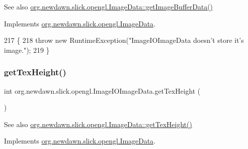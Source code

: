\begin{DoxySeeAlso}{See also}
\mbox{\hyperlink{interfaceorg_1_1newdawn_1_1slick_1_1opengl_1_1_image_data_a7b15d49f552cad075bb1179668ce5250}{org.\+newdawn.\+slick.\+opengl.\+Image\+Data\+::get\+Image\+Buffer\+Data()}} 
\end{DoxySeeAlso}


Implements \mbox{\hyperlink{interfaceorg_1_1newdawn_1_1slick_1_1opengl_1_1_image_data_a7b15d49f552cad075bb1179668ce5250}{org.\+newdawn.\+slick.\+opengl.\+Image\+Data}}.


\begin{DoxyCode}
217                                            \{
218         \textcolor{keywordflow}{throw} \textcolor{keyword}{new} RuntimeException(\textcolor{stringliteral}{"ImageIOImageData doesn't store it's image."});
219     \} 
\end{DoxyCode}
\mbox{\label{classorg_1_1newdawn_1_1slick_1_1opengl_1_1_image_i_o_image_data_a771cf308dff01137431513eb48497cd2}} 
\subsubsection{\texorpdfstring{get\+Tex\+Height()}{getTexHeight()}}
{\footnotesize\ttfamily int org.\+newdawn.\+slick.\+opengl.\+Image\+I\+O\+Image\+Data.\+get\+Tex\+Height (\begin{DoxyParamCaption}{ }\end{DoxyParamCaption})\hspace{0.3cm}{\ttfamily [inline]}}

\begin{DoxySeeAlso}{See also}
\mbox{\hyperlink{interfaceorg_1_1newdawn_1_1slick_1_1opengl_1_1_image_data_a316891c94ba43967d0554378c7197324}{org.\+newdawn.\+slick.\+opengl.\+Image\+Data\+::get\+Tex\+Height()}} 
\end{DoxySeeAlso}


Implements \mbox{\hyperlink{interfaceorg_1_1newdawn_1_1slick_1_1opengl_1_1_image_data_a316891c94ba43967d0554378c7197324}{org.\+newdawn.\+slick.\+opengl.\+Image\+Data}}.


